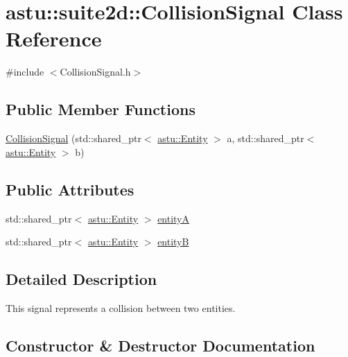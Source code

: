 \hypertarget{classastu_1_1suite2d_1_1CollisionSignal}{}\section{astu\+:\+:suite2d\+:\+:Collision\+Signal Class Reference}
\label{classastu_1_1suite2d_1_1CollisionSignal}


{\ttfamily \#include $<$Collision\+Signal.\+h$>$}

\subsection*{Public Member Functions}
\begin{DoxyCompactItemize}
\item 
\hyperlink{classastu_1_1suite2d_1_1CollisionSignal_a415a7bde99513f42d1192bf07c3afd5c}{Collision\+Signal} (std\+::shared\+\_\+ptr$<$ \hyperlink{classastu_1_1Entity}{astu\+::\+Entity} $>$ a, std\+::shared\+\_\+ptr$<$ \hyperlink{classastu_1_1Entity}{astu\+::\+Entity} $>$ b)
\end{DoxyCompactItemize}
\subsection*{Public Attributes}
\begin{DoxyCompactItemize}
\item 
std\+::shared\+\_\+ptr$<$ \hyperlink{classastu_1_1Entity}{astu\+::\+Entity} $>$ \hyperlink{classastu_1_1suite2d_1_1CollisionSignal_a7ace89d8dca0c0b38e74d8bd04ecead1}{entityA}
\item 
std\+::shared\+\_\+ptr$<$ \hyperlink{classastu_1_1Entity}{astu\+::\+Entity} $>$ \hyperlink{classastu_1_1suite2d_1_1CollisionSignal_a5a68c5c6df677411bcc8a30a1df8b53b}{entityB}
\end{DoxyCompactItemize}


\subsection{Detailed Description}
This signal represents a collision between two entities. 

\subsection{Constructor \& Destructor Documentation}
\mbox{\label{classastu_1_1suite2d_1_1CollisionSignal_a415a7bde99513f42d1192bf07c3afd5c}} 
